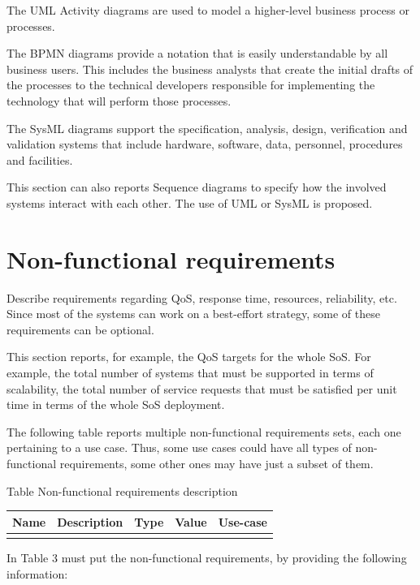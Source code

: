 \documentclass{article}
\newcounter{Table}
\renewcommand\theTable{\arabic{Table}}
\begin{document}
The UML Activity diagrams are used to model a higher-level business process or processes.\ \ 

The BPMN diagrams provide a notation that is easily understandable by all business users. This includes the business analysts that create the initial drafts of the processes to the technical developers responsible for implementing the technology that will perform those processes.

The SysML diagrams support the specification, analysis, design, verification and validation systems that include hardware, software, data, personnel, procedures and facilities.

This section can also reports Sequence diagrams to specify how the involved systems interact with each other. The use of UML or SysML is proposed.

\section{Non-functional requirements}
Describe requirements regarding QoS, response time, resources, reliability, etc. Since most of the systems can work on a best-effort strategy, some of these requirements can be optional.

This section reports, for example, the QoS targets for the whole SoS. For example, the total number of systems that must be supported in terms of scalability, the total number of service requests that must be satisfied per unit time in terms of the whole SoS deployment.

The following table reports multiple non-functional requirements sets, each one pertaining to a use case. Thus, some use cases could have all types of non-functional requirements, some other ones may have just a subset of them.

Table \stepcounter{Table}{\theTable} Non-functional requirements description

\begin{flushleft}
\tablefirsthead{}
\tablehead{}
\tabletail{}
\tablelasttail{}
\begin{supertabular}{|m{0.8622598in}|m{2.5504599in}|m{0.7434598in}|m{0.7156598in}|m{0.82545984in}|}
\hline
Name &
Description &
Type &
Value &
Use{}-case\\\hline
 &
 &
 &
 &
\\\hline
\end{supertabular}
\end{flushleft}
In Table 3 must put the non-functional requirements, by providing the following information:
\end{document}
